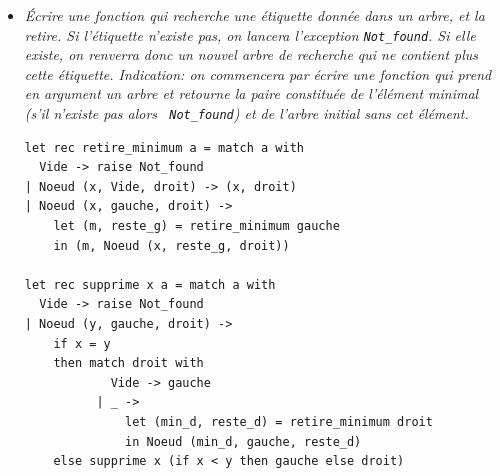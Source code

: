 \documentclass[11pt, a4paper]{article}
\begin{document}
\begin{itemize}
        \emph{On en déduit alors un algorithme de tri de liste. On
        part d'un arbre de recherche vide dans lequel on insère
        successivement toutes les valeurs de la liste à trier. Il ne
        reste plus qu'à afficher par ordre croissant les étiquettes de
        cet arbre grâce à la fonction précédente. L'ordre dans lequel
        on réalise les insertions est-il significatif?}

        \smallskip

\begin{verbatim}
let tri_liste l =
  infixe (List.fold_right ajout l Vide)
\end{verbatim}

        \noindent
        L'ordre d'insertion n'est pas significatif pour la correction
        de l'algorithme.

        \smallskip

  \item \emph{Écrire une fonction qui recherche une étiquette donnée
        dans un arbre, et la retire. Si l'étiquette n'existe pas, on
        lancera l'exception {\tt Not\_found}. Si elle existe, on
        renverra donc un nouvel arbre de recherche qui ne contient
        plus cette étiquette. Indication: on commencera par écrire une
        fonction qui prend en argument un arbre et retourne la paire
        constituée de l'élément minimal (s'il n'existe pas alors {\tt
        Not\_found}) et de l'arbre initial sans cet élément.}

        \smallskip

\begin{verbatim}
let rec retire_minimum a = match a with
  Vide -> raise Not_found
| Noeud (x, Vide, droit) -> (x, droit)
| Noeud (x, gauche, droit) ->
    let (m, reste_g) = retire_minimum gauche
    in (m, Noeud (x, reste_g, droit))

let rec supprime x a = match a with
  Vide -> raise Not_found
| Noeud (y, gauche, droit) ->
    if x = y
    then match droit with
            Vide -> gauche
          | _ ->
              let (min_d, reste_d) = retire_minimum droit
              in Noeud (min_d, gauche, reste_d)
    else supprime x (if x < y then gauche else droit)
\end{verbatim}

\end{itemize}
\end{document}
